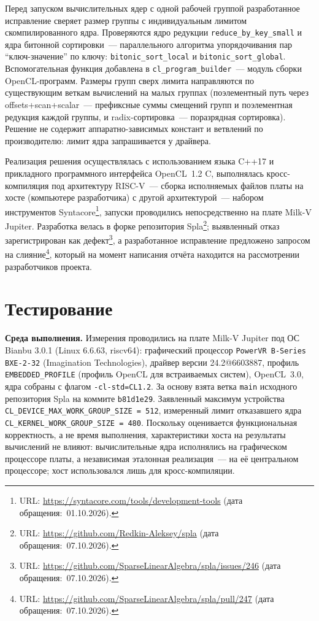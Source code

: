 \documentclass[a4paper]{article}
\begin{document}
Перед запуском вычислительных ядер с одной рабочей группой разработанное исправление сверяет размер группы с индивидуальным лимитом скомпилированного ядра. Проверяются ядро редукции \texttt{reduce\_by\_key\_small} и ядра битонной сортировки~--- параллельного алгоритма упорядочивания пар \enquote{ключ-значение} по ключу: \texttt{bitonic\_sort\_local} и \texttt{bitonic\_sort\_global}. Вспомогательная функция добавлена в \texttt{cl\_program\_builder}~--- модуль сборки OpenCL-программ. Размеры групп сверх лимита направляются по существующим веткам вычислений на малых группах (поэлементный путь через offsets+scan+scalar~--- префиксные суммы смещений групп и поэлементная редукция каждой группы, и radix-сортировка~--- поразрядная сортировка). Решение не содержит аппаратно-зависимых констант и ветвлений по производителю: лимит ядра запрашивается у драйвера.

Реализация решения осуществлялась с использованием языка C++17 и прикладного программного интерфейса OpenCL~1.2 C, выполнялась кросс-компиляция под архитектуру RISC-V~--- сборка исполняемых файлов платы на хосте (компьютере разработчика) с другой архитектурой~--- набором инструментов Syntacore\footnote{URL: \url{https://syntacore.com/tools/development-tools} (дата обращения:~01.10.2026).}, запуски проводились непосредственно на плате Milk-V Jupiter. Разработка велась в форке репозитория Spla\footnote{URL: \url{https://github.com/Redkin-Aleksey/spla} (дата обращения:~07.10.2026).}; выявленный отказ зарегистрирован как дефект\footnote{URL: \url{https://github.com/SparseLinearAlgebra/spla/issues/246} (дата обращения:~07.10.2026).}, а разработанное исправление предложено запросом на слияние\footnote{URL: \url{https://github.com/SparseLinearAlgebra/spla/pull/247} (дата обращения:~07.10.2026).}, который на момент написания отчёта находится на рассмотрении разработчиков проекта.

\section{Тестирование}

\textbf{Среда выполнения.} Измерения проводились на плате Milk-V Jupiter под ОС Bianbu 3.0.1 (Linux 6.6.63, riscv64): графический процессор \texttt{PowerVR B-Series BXE-2-32} (Imagination Technologies), драйвер версии 24.2@6603887, профиль \texttt{EMBEDDED\_PROFILE} (профиль OpenCL для встраиваемых систем), OpenCL~3.0, ядра собраны с флагом \texttt{-cl-std=CL1.2}. За основу взята ветка \texttt{main} исходного репозитория Spla на коммите \texttt{b81d1e29}. Заявленный максимум устройства \texttt{CL\_DEVICE\_MAX\_WORK\_GROUP\_SIZE = 512}, измеренный лимит отказавшего ядра \texttt{CL\_KERNEL\_WORK\_GROUP\_SIZE = 480}. Поскольку оценивается функциональная корректность, а не время выполнения, характеристики хоста на результаты вычислений не влияют: вычислительные ядра исполнялись на графическом процессоре платы, а независимая эталонная реализация~--- на её центральном процессоре; хост использовался лишь для кросс-компиляции.
\end{document}
